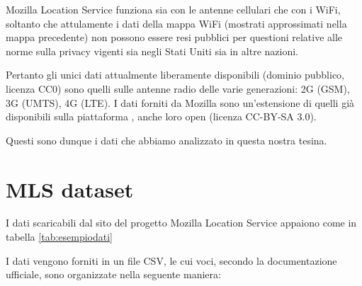 Mozilla Location Service funziona sia con le antenne cellulari che con i WiFi, soltanto che attulamente i dati della mappa WiFi (mostrati approssimati nella mappa precedente) non possono essere resi pubblici per questioni relative alle norme sulla privacy vigenti sia negli Stati Uniti sia in altre nazioni.

Pertanto gli unici dati attualmente liberamente disponibili (dominio pubblico, licenza CC0) sono quelli sulle antenne radio delle varie generazioni: 2G (GSM), 3G (UMTS), 4G (LTE).
I dati forniti da Mozilla sono un'estensione di quelli già disponibili sulla piattaforma , anche loro open (licenza CC-BY-SA 3.0).

Questi sono dunque i dati che abbiamo analizzato in questa nostra tesina.

\clearpage
\section{MLS dataset}
\label{sec:mls}
I dati scaricabili dal sito del progetto Mozilla Location Service appaiono come in tabella \ref{tab:esempiodati}

I dati vengono forniti in un file CSV, le cui voci, secondo la documentazione ufficiale, sono organizzate nella seguente maniera:

